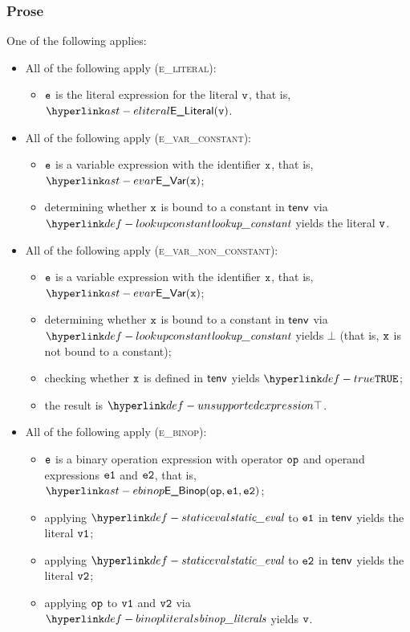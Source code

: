 \subsubsection{Prose}
One of the following applies:
\begin{itemize}
  \item All of the following apply (\textsc{e\_literal}):
  \begin{itemize}
    \item $\texttt{e}$ is the literal expression for the literal $\texttt{v}$, that is, $\ELiteral(\vv)$.
  \end{itemize}

  \item All of the following apply (\textsc{e\_var\_constant}):
  \begin{itemize}
    \item $\texttt{e}$ is a variable expression with the identifier $\texttt{x}$, that is, $\EVar(\vx)$;
    \item determining whether $\texttt{x}$ is bound to a constant in $\textsf{tenv}$ via $\lookupconstant$ yields the literal $\texttt{v}$.
  \end{itemize}

  \item All of the following apply (\textsc{e\_var\_non\_constant}):
  \begin{itemize}
    \item $\texttt{e}$ is a variable expression with the identifier $\texttt{x}$, that is, $\EVar(\vx)$;
    \item determining whether $\texttt{x}$ is bound to a constant in $\textsf{tenv}$ via $\lookupconstant$ yields $\bot$
          (that is, $\texttt{x}$ is not bound to a constant);
    \item checking whether $\texttt{x}$ is defined in $\textsf{tenv}$ yields $\True$\ProseOrTypeError;
    \item the result is $\CannotBeTransformed$.
  \end{itemize}

  \item All of the following apply (\textsc{e\_binop}):
  \begin{itemize}
    \item $\texttt{e}$ is a binary operation expression with operator $\texttt{op}$ and operand expressions $\texttt{e1}$ and $\texttt{e2}$,
          that is, $\EBinop(\op, \veone, \vetwo)$;
    \item applying $\staticeval$ to $\texttt{e1}$ in $\textsf{tenv}$ yields the literal $\texttt{v1}$\ProseTerminateAs{\CannotBeTransformed, \TypeErrorConfig};
    \item applying $\staticeval$ to $\texttt{e2}$ in $\textsf{tenv}$ yields the literal $\texttt{v2}$\ProseTerminateAs{\CannotBeTransformed, \TypeErrorConfig};
    \item applying $\texttt{op}$ to $\texttt{v1}$ and $\texttt{v2}$ via $\binopliterals$ yields $\texttt{v}$\ProseOrTypeError.
  \end{itemize}


\end{itemize}
